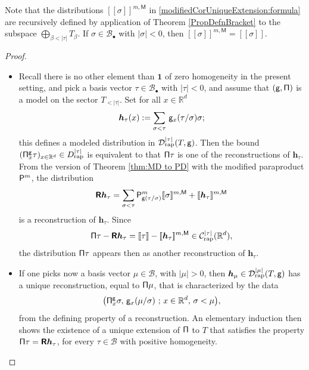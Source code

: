 \documentclass[JEP,XML,SOM,Unicode,published]{cedram}
\newcommand{\sbullet}{{\scriptscriptstyle\bullet}}
\theoremstyle{plain}
\theoremstyle{definition}
\newcommand{\unit}{\mathbf{1}}
\newcommand{\Brac}[1]{[\![#1]\!]}
\newcommand{\bsh}{\boldsymbol{h}}
\newcommand{\rap}{\mathrm{rap}}
\newcommand{\reR}{\boldsymbol{\mathsf{R}}}
\newcommand{\sfM}{\mathsf{M}}
\newcommand{\bbR}{\mathbb{R}}
\newcommand{\mcB}{\mathcal{B}}
\newcommand{\mcC}{\mathcal{C}}
\newcommand{\mcD}{\mathcal{D}}
\begin{document}
Note that the distributions $\Brac{\sigma}^{m,\sfM}$ in \eqref{modifiedCorUniqueExtension:formula} are recursively defined by application of Theorem \ref{PropDefnBracket} to the subspace $\bigoplus_{\beta<|\tau|}T_\beta$. If $\sigma\in\mcB_\sbullet$ with $\vert\sigma\vert<0$, then $\Brac{\sigma}^{m,\sfM}=\Brac{\sigma}$.

\skpt
\begin{proof}
\begin{itemize}
\item
Recall there is no other element than $\unit$ of zero homogeneity in the present setting, and pick a basis vector $\tau\in\mcB_\sbullet$ with $|\tau|<0$, and assume that $\sf(g,\Pi)$ is a model on the sector $T_{<|\tau|}$. Set for all $x\in\bbR^d$
\[
\bsh_\tau(x) := \sum_{\sigma<\tau}\, {\sf g}_x(\tau/\sigma)\sigma;
\]
this defines a modeled distribution in $\mcD_\rap^{|\tau|}(T,{\sf g})$. Then the bound $({\sf\Pi}_x^{\sf g}\tau)_{x\in\bbR^d}\in D_{\rap}^{|\tau|}$
is equivalent to that ${\sf \Pi}\tau$ is one of the reconstructions of $\bsh_\tau$. From the version of Theorem \ref{thm:MD to PD} with the modified paraproduct ${\sf P}^m$, the distribution
\[
\reR\bsh_\tau
=\sum_{\sigma<\tau} {\sf P}^m_{{\sf g}(\tau/\sigma)}\Brac{\sigma}^{m,{\sf M}} + \Brac{\bsh_\tau}^{m,{\sf M}}
\]
is a reconstruction of $\bsh_\tau$. Since
\[
{\sf \Pi}\tau - \reR\bsh_\tau = \Brac{\tau} - \Brac{\bsh_\tau}^{m,{\sf M}} \in \mcC_\rap^{|\tau|}(\bbR^d),
\]
the distribution ${\sf \Pi}\tau$ appears then as another reconstruction of $\bsh_\tau$.

\item
If one picks now a basis vector $\mu\in\mcB$, with $|\mu|>0$, then $\bsh_\mu\in\mcD_\rap^{|\mu|}(T,{\sf g})$ has a unique reconstruction, equal to ${\sf \Pi}\mu$, that is characterized by the data
\[
\bigl({\sf\Pi}_x^{\sf g}\sigma,\, {\sf g}_x(\mu/\sigma)\ ;\, x\in\bbR^d,\, \sigma<\mu\bigr),
\]
from the defining property of a reconstruction. An elementary induction then shows the existence of a unique extension of $\sf \Pi$ to $T$ that satisfies the property ${\sf \Pi}\tau = \reR\bsh_\tau$, for every $\tau\in\mcB$ with positive homogeneity.\qedhere
\end{itemize}
\end{proof}
\end{document}
